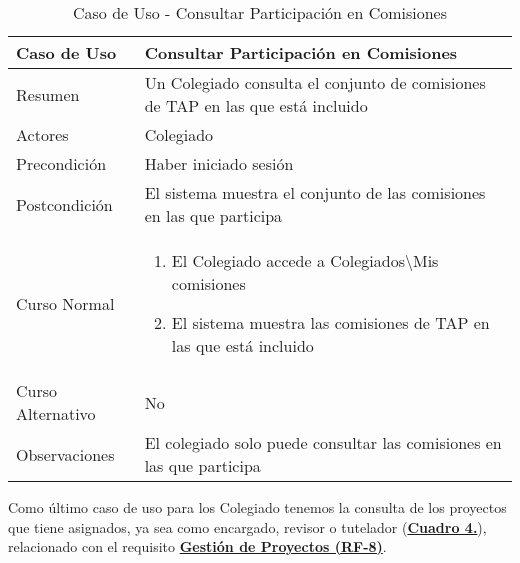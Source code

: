 \begin{table}[!htbp]
  \centering  \addtocounter{casouso}{1}
  \begin{tabular}{|l | p{100mm}|}
    \textbf{Caso de Uso}  & \textbf{Consultar Participación en Comisiones} \\ \hline
    Resumen 		 & Un Colegiado consulta el conjunto de comisiones de TAP en las que está incluido \\ \hline
    Actores  		 & Colegiado \\ \hline
    Precondición  	 & Haber iniciado sesión \\ \hline
    Postcondición  	 & El sistema muestra el conjunto de las comisiones en las que participa \\ \hline
    Curso Normal   	 & \begin{enumerate}
	  \item El Colegiado accede a Colegiados\textbackslash Mis comisiones
	  \item El sistema muestra las comisiones de TAP en las que está incluido
    \end{enumerate}  \\ \hline
    Curso Alternativo  & No  \\ \hline
    Observaciones 	 & El colegiado solo puede consultar las comisiones en las que participa \\ \hline
  \end{tabular}
  \caption{Caso de Uso  - Consultar Participación en Comisiones}
  \label{tab:cucConsultaComision}
\end{table}
\FloatBarrier


\addtocounter{tabla}{1}
Como último caso de uso para los Colegiado tenemos la consulta de los proyectos que tiene asignados, ya sea como encargado, revisor o tutelador (\textbf{\hyperref[tab:cucConsultaProyectos]{Cuadro 4.}}), relacionado con el requisito \textbf{\hyperref[tab:rfGestProyectos]{Gestión de Proyectos (RF-8)}}.

